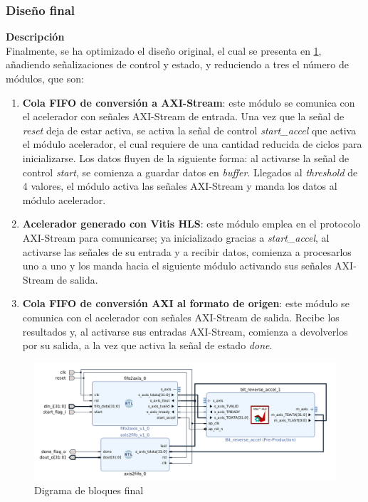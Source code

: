 \subsubsection{Diseño final}
\begin{adjustwidth}{1.5cm}{}
\textbf{Descripción} \vspace{0.25cm} \\
Finalmente, se ha optimizado el diseño original, el cual se presenta en \ref{fig:disenoFinal}, añadiendo señalizaciones de control y estado, y reduciendo a tres el número de módulos, que son:

\begin{enumerate}
    \item \textbf{Cola FIFO de conversión a AXI-Stream}: este módulo se comunica con el acelerador con señales AXI-Stream de entrada. Una vez que la señal de \emph{reset} deja de estar activa, se activa la señal de control \emph{start\_accel} que activa el módulo acelerador, el cual requiere de una cantidad reducida de ciclos para inicializarse. Los datos fluyen de la siguiente forma: al activarse la señal de control \emph{start}, se comienza a guardar datos en \textit{buffer}. Llegados al \textit{threshold} de 4 valores, el módulo activa las señales AXI-Stream y manda los datos al módulo acelerador.
    \item \textbf{Acelerador generado con Vitis HLS}: este módulo emplea en el protocolo AXI-Stream para comunicarse; ya inicializado gracias a \emph{start\_accel}, al activarse las señales de su entrada y a recibir datos, comienza a procesarlos uno a uno y los manda hacia el siguiente módulo activando sus señales AXI-Stream de salida.
    \item \textbf{Cola FIFO de conversión AXI al formato de origen}: este módulo se comunica con el acelerador con señales AXI-Stream de salida. Recibe los resultados y, al activarse sus entradas AXI-Stream, comienza a devolverlos por su salida, a la vez que activa la señal de estado \emph{done}.
\end{enumerate}

\begin{figure}[!ht]
    \centering
    \includegraphics[width=12cm]{figures/disenoFinal.png}
    \caption{Digrama de bloques final}
    \label{fig:disenoFinal}
\end{figure}
\end{adjustwidth}

